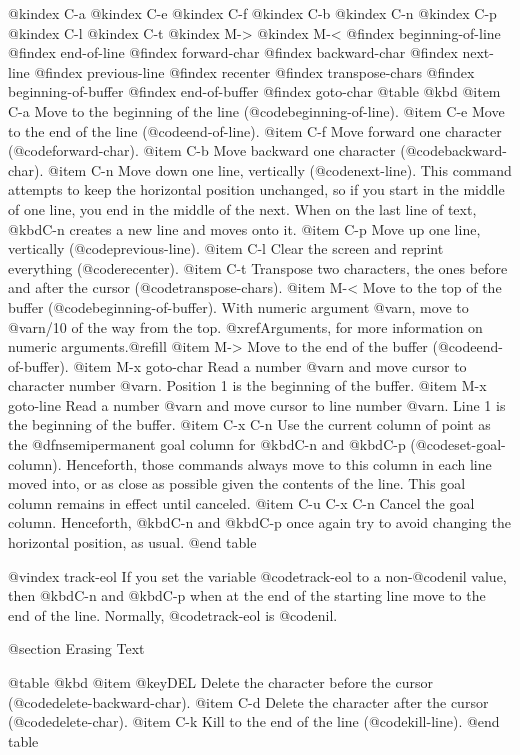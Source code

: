 {{@kindex C-a
@kindex C-e
@kindex C-f
@kindex C-b
@kindex C-n
@kindex C-p
@kindex C-l
@kindex C-t
@kindex M->
@kindex M-<
@findex beginning-of-line
@findex end-of-line
@findex forward-char
@findex backward-char
@findex next-line
@findex previous-line
@findex recenter
@findex transpose-chars
@findex beginning-of-buffer
@findex end-of-buffer
@findex goto-char
@table @kbd
@item C-a
Move to the beginning of the line (@code{beginning-of-line}).
@item C-e
Move to the end of the line (@code{end-of-line}).
@item C-f
Move forward one character (@code{forward-char}).
@item C-b
Move backward one character (@code{backward-char}).
@item C-n
Move down one line, vertically (@code{next-line}).  This command
attempts to keep the horizontal position unchanged, so if you start in
the middle of one line, you end in the middle of the next.  When on
the last line of text, @kbd{C-n} creates a new line and moves onto it.
@item C-p
Move up one line, vertically (@code{previous-line}).
@item C-l
Clear the screen and reprint everything (@code{recenter}).
@item C-t
Transpose two characters, the ones before and after the cursor
(@code{transpose-chars}).
@item M-<
Move to the top of the buffer (@code{beginning-of-buffer}).  With
numeric argument @var{n}, move to @var{n}/10 of the way from the top.
@xref{Arguments}, for more information on numeric arguments.@refill
@item M->
Move to the end of the buffer (@code{end-of-buffer}).
@item M-x goto-char
Read a number @var{n} and move cursor to character number @var{n}.
Position 1 is the beginning of the buffer.
@item M-x goto-line
Read a number @var{n} and move cursor to line number @var{n}.  Line 1
is the beginning of the buffer.
@item C-x C-n
Use the current column of point as the @dfn{semipermanent goal column} for
@kbd{C-n} and @kbd{C-p} (@code{set-goal-column}).  Henceforth, those
commands always move to this column in each line moved into, or as
close as possible given the contents of the line.  This goal column remains
in effect until canceled.
@item C-u C-x C-n
Cancel the goal column.  Henceforth, @kbd{C-n} and @kbd{C-p} once
again try to avoid changing the horizontal position, as usual.
@end table

@vindex track-eol
  If you set the variable @code{track-eol} to a non-@code{nil} value, then
@kbd{C-n} and @kbd{C-p} when at the end of the starting line move to the
end of the line.  Normally, @code{track-eol} is @code{nil}.

@section Erasing Text

@table @kbd
@item @key{DEL}
Delete the character before the cursor (@code{delete-backward-char}).
@item C-d
Delete the character after the cursor (@code{delete-char}).
@item C-k
Kill to the end of the line (@code{kill-line}).
@end table

}}
